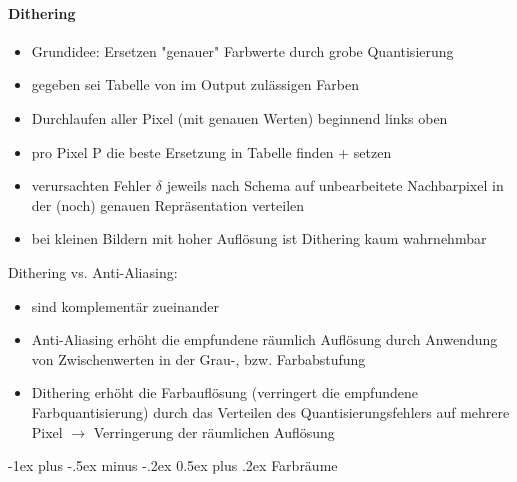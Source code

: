 \documentclass[10pt,landscape]{article}
\makeatletter
\renewcommand{\section}{\@startsection{section}{1}{0mm}%
                                {-1ex plus -.5ex minus -.2ex}%
                                {0.5ex plus .2ex}%
                                {\normalfont\large\bfseries}}
\makeatother
\begin{document}
\begin{multicols}{3}
  \paragraph{Dithering}
  \begin{itemize}
    \item Grundidee: Ersetzen "genauer" Farbwerte durch grobe Quantisierung
    \item gegeben sei Tabelle von im Output zulässigen Farben
    \item Durchlaufen aller Pixel (mit genauen Werten) beginnend links oben
    \item pro Pixel P die beste Ersetzung in Tabelle finden + setzen
    \item verursachten Fehler $\delta$ jeweils nach Schema auf unbearbeitete Nachbarpixel in der (noch) genauen Repräsentation verteilen
    \item bei kleinen Bildern mit hoher Auflösung ist Dithering kaum wahrnehmbar
  \end{itemize}
  Dithering vs. Anti-Aliasing:
  \begin{itemize}
    \item sind komplementär zueinander
    \item Anti-Aliasing erhöht die empfundene räumlich Auflösung durch Anwendung von Zwischenwerten in der Grau-, bzw. Farbabstufung
    \item Dithering erhöht die Farbauflösung (verringert die empfundene Farbquantisierung) durch das Verteilen des Quantisierungsfehlers auf mehrere Pixel $\rightarrow$ Verringerung der räumlichen Auflösung
  \end{itemize}
  
  \section{Farbräume}

\end{multicols}
\end{document}
